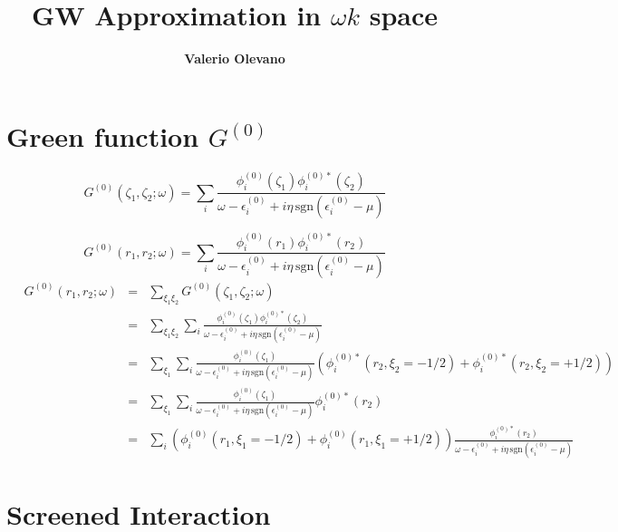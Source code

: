 \documentclass[fleqn]{article}
\title{\bf GW Approximation in $\omega k$ space}
\author{\bf Valerio Olevano}
\begin{document}
\maketitle
\tableofcontents

\newpage

\section{Green function $G^{(0)}$}

\[
  G^{(0)}(\zeta_1,\zeta_2;\omega) =
  \sum_i \frac{\phi^{(0)}_i(\zeta_1) \phi^{(0)*}_i(\zeta_2)}
  {\omega - \epsilon^{(0)}_i + i \eta \mathrm{\, sgn} \left( \epsilon^{(0)}_i - \mu \right)}
\]

\[
  G^{(0)}(r_1,r_2;\omega) =
  \sum_i \frac{\phi^{(0)}_i(r_1) \phi^{(0)*}_i(r_2)}
  {\omega - \epsilon^{(0)}_i + i \eta \mathrm{\, sgn} \left( \epsilon^{(0)}_i - \mu \right)}
\]
\begin{eqnarray*}
  \quad
  G^{(0)}(r_1,r_2;\omega) &=&
  \sum_{\xi_1 \xi_2} G^{(0)}(\zeta_1,\zeta_2;\omega)
  \\ &=&
  \sum_{\xi_1 \xi_2}    \sum_i \frac{\phi^{(0)}_i(\zeta_1) \phi^{(0)*}_i(\zeta_2)}
  {\omega - \epsilon^{(0)}_i + i \eta \mathrm{\, sgn} \left( \epsilon^{(0)}_i - \mu \right)}
  \\
  &=& \sum_{\xi_1}  \sum_i \frac{\phi^{(0)}_i(\zeta_1)}
  {\omega - \epsilon^{(0)}_i + i \eta \mathrm{\, sgn} \left( \epsilon^{(0)}_i - \mu \right)}
  \left( \phi^{(0)*}_i(r_2,\xi_2=-1/2) + \phi^{(0)*}_i(r_2,\xi_2=+1/2) \right)
  \\
  &=& \sum_{\xi_1}  \sum_i \frac{\phi^{(0)}_i(\zeta_1)}
  {\omega - \epsilon^{(0)}_i + i \eta \mathrm{\, sgn} \left( \epsilon^{(0)}_i - \mu \right)}
  \phi^{(0)*}_i(r_2)
  \\
  &=&  \sum_i \left( \phi^{(0)}_i(r_1,\xi_1=-1/2) + \phi^{(0)}_i(r_1,\xi_1=+1/2) \right)
  \frac{\phi^{(0)*}_i(r_2)}
  {\omega - \epsilon^{(0)}_i + i \eta \mathrm{\, sgn} \left( \epsilon^{(0)}_i - \mu \right)}
\end{eqnarray*}

\newpage

\section{Screened Interaction}
\end{document}
